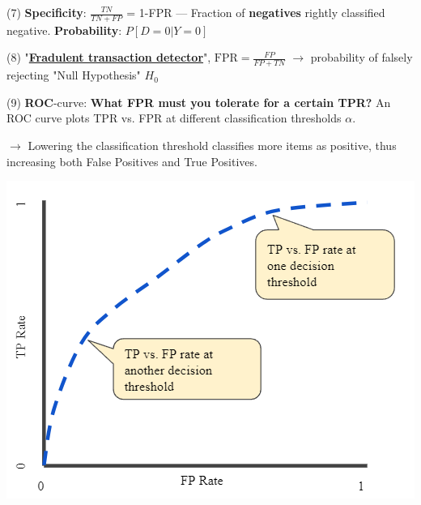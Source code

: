 \documentclass[letterpaper, 10.5pt,landscape]{article}
\begin{document}
\begin{multicols*}{3}
\vspace{2pt}

(7) \textbf{Specificity}: \(\boxed{\frac{TN}{TN+FP}} \) = 1-FPR  — Fraction of \textbf{negatives} rightly classified negative.  \textbf{Probability}: $\boxed{P[D=0 | Y=0]}$

\vspace{2pt}

(8) "\underline{\textbf{Fradulent transaction detector}}", $\boxed{\text{FPR} = \frac{FP}{FP+TN}}$ $\rightarrow$ probability of falsely rejecting "Null Hypothesis" $H_{0}$

\vspace{2pt}

(9) \textbf{ROC}-curve: \textbf{What FPR must you tolerate for a certain TPR?} An ROC curve plots TPR vs. FPR at different classification thresholds $\alpha$.


$\rightarrow$ Lowering the classification threshold classifies more items as positive, thus increasing both False Positives and True Positives.

\vspace{-3pt}

\begin{center}
    \begin{minipage}{0.75\linewidth}
        \includegraphics[width=\textwidth]{figures/ROC_curve.PNG}
    \end{minipage}
\end{center}


\end{multicols*}
\end{document}
